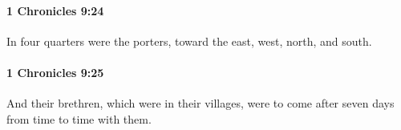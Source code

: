 		\paragraph{1 Chronicles 9:24} %
			\label{1CHRONICLES-9-24}

			In four quarters were the porters, toward the east, west, north, and south.


		\paragraph{1 Chronicles 9:25} %
			\label{1CHRONICLES-9-25}

			And their brethren, which were in their villages, were to come after seven days from time to time with them.


